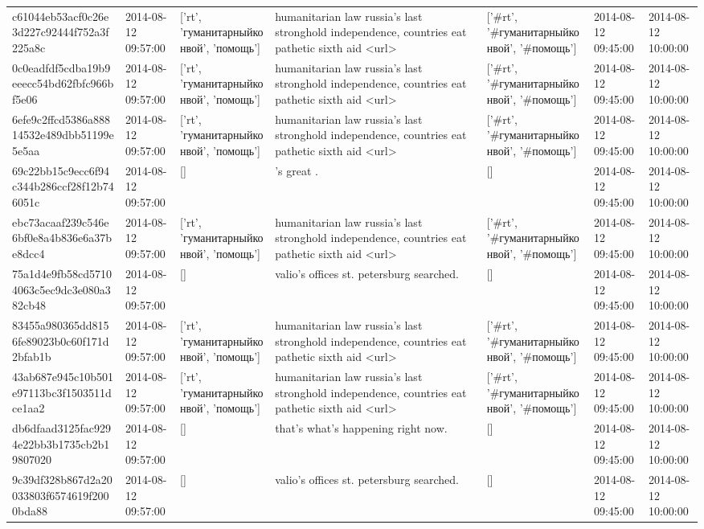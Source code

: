 \begin{tabular}{lllllll}
c61044eb53acf0c26e3d227c92444f752a3f225a8c & 2014-08-12 09:57:00 & ['rt', 'гуманитарныйконвой', 'помощь'] & humanitarian law russia's last stronghold independence, countries eat pathetic sixth aid <url> & ['#rt', '#гуманитарныйконвой', '#помощь'] & 2014-08-12 09:45:00 & 2014-08-12 10:00:00 \\
0c0eadfdf5cdba19b9eeecc54bd62fbfc966bf5e06 & 2014-08-12 09:57:00 & ['rt', 'гуманитарныйконвой', 'помощь'] & humanitarian law russia's last stronghold independence, countries eat pathetic sixth aid <url> & ['#rt', '#гуманитарныйконвой', '#помощь'] & 2014-08-12 09:45:00 & 2014-08-12 10:00:00 \\
6efe9c2ffcd5386a88814532e489dbb51199e5e5aa & 2014-08-12 09:57:00 & ['rt', 'гуманитарныйконвой', 'помощь'] & humanitarian law russia's last stronghold independence, countries eat pathetic sixth aid <url> & ['#rt', '#гуманитарныйконвой', '#помощь'] & 2014-08-12 09:45:00 & 2014-08-12 10:00:00 \\
69c22bb15c9ecc6f94c344b286ccf28f12b746051c & 2014-08-12 09:57:00 & [] & 's great . & [] & 2014-08-12 09:45:00 & 2014-08-12 10:00:00 \\
ebc73acaaf239c546e6bf0e8a4b836e6a37be8dcc4 & 2014-08-12 09:57:00 & ['rt', 'гуманитарныйконвой', 'помощь'] & humanitarian law russia's last stronghold independence, countries eat pathetic sixth aid <url> & ['#rt', '#гуманитарныйконвой', '#помощь'] & 2014-08-12 09:45:00 & 2014-08-12 10:00:00 \\
75a1d4e9fb58cd57104063c5ec9dc3e080a382cb48 & 2014-08-12 09:57:00 & [] & valio's offices st. petersburg searched. & [] & 2014-08-12 09:45:00 & 2014-08-12 10:00:00 \\
83455a980365dd8156fe89023b0c60f171d2bfab1b & 2014-08-12 09:57:00 & ['rt', 'гуманитарныйконвой', 'помощь'] & humanitarian law russia's last stronghold independence, countries eat pathetic sixth aid <url> & ['#rt', '#гуманитарныйконвой', '#помощь'] & 2014-08-12 09:45:00 & 2014-08-12 10:00:00 \\
43ab687e945c10b501e97113bc3f1503511dce1aa2 & 2014-08-12 09:57:00 & ['rt', 'гуманитарныйконвой', 'помощь'] & humanitarian law russia's last stronghold independence, countries eat pathetic sixth aid <url> & ['#rt', '#гуманитарныйконвой', '#помощь'] & 2014-08-12 09:45:00 & 2014-08-12 10:00:00 \\
db6dfaad3125fac9294e22bb3b1735cb2b19807020 & 2014-08-12 09:57:00 & [] & that's what's happening right now. & [] & 2014-08-12 09:45:00 & 2014-08-12 10:00:00 \\
9c39df328b867d2a20033803f6574619f2000bda88 & 2014-08-12 09:57:00 & [] & valio's offices st. petersburg searched. & [] & 2014-08-12 09:45:00 & 2014-08-12 10:00:00 \\

\end{tabular}
